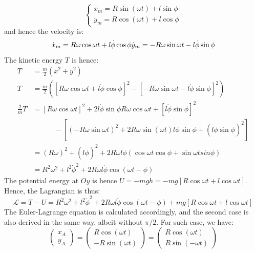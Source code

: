 \begin{equation}
    \begin{cases}
        x_{m} = R\sin{(\omega t)} + l \sin{\phi}\\
        y_{m} = R\cos{(\omega t)} + l \cos{\phi}
    \end{cases}
\end{equation}
and hence the velocity is: 
\begin{equation}
    \dot{x}_{m} = R\omega \cos{\omega t} + l \dot{\phi}\cos{\phi}\\
    \dot{y}_{m} = - R\omega \sin{\omega t} - l \dot{\phi}\sin{\phi}
\end{equation}
The kinetic energy $T$ is hence: 
\begin{equation}
    \begin{split}
        T 
        & = \frac{m}{2} (\dot{x}^{2} + \dot{y}^{2})\\
        T & = \frac{m}{2}\left( \left[ R\omega \cos{\omega t} + l \dot{\phi}\cos{\phi}  \right]^{2} - \left[ - R\omega \sin{\omega t} - l \dot{\phi}\sin{\phi} \right]^{2}\right)\\
        \frac{2}{m}T& = \left[R\omega \cos{\omega t}\right]^{2} + 2l \dot{\phi} \sin{\phi} R\omega \cos{\omega t} + \left[ l\dot{\phi}\sin{\phi} \right]^{2}  \\
        & \quad \quad \quad -\left[ \left(-R\omega \sin{\omega t}\right)^{2} + 2R\omega \sin{(\omega t)} l \dot{\phi}\sin{\phi} + \left(l \dot{\phi}\sin{\phi}\right)^{2} \right]\\
        & = (R\omega)^{2} + (l \dot{\phi})^{2} + 2R\omega l\dot{\phi} (\cos{\omega t}\cos{\phi} + \sin{\omega t}sin{\phi})\\
        & = R^{2}\omega^{2} + l^{2}\dot{\phi}^{2} + 2R \omega l\dot{\phi}\cos{(\omega t - \phi)} 
    \end{split}
\end{equation}
The potential energy at $Oy$ is hence $U=-mgh  =-mg\left[R\cos{\omega t}+ l \cos{\omega t}\right]$. Hence, the Lagrangian is thus: 
\begin{equation}
    \mathcal{L} = T- U = R^{2}\omega^{2} + l^{2}\dot{\phi}^{2} + 2R \omega l\dot{\phi}\cos{(\omega t - \phi)} + mg\left[R\cos{\omega t}+ l \cos{\omega t}\right] 
\end{equation}
The Euler-Lagrange equation is calculated accordingly, and the second case is also derived in the same way, albeit without $\pi/2$. For such case, we have: 
\begin{equation}
    \begin{pmatrix}
        x_{A} \\
        y_{A}
    \end{pmatrix}
    = \begin{pmatrix}
        R\cos{(\omega t)} \\
        - R\sin{(\omega t)}
    \end{pmatrix} = 
    \begin{pmatrix}
        R\cos{(\omega t)}\\
        R\sin{(-\omega t)}
    \end{pmatrix}
\end{equation}
